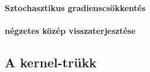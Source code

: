 \paragraph[SGD]{Sztochasztikus gradienscsökkentés}

\paragraph[RMSprop]{négzetes közép visszaterjesztése}


\subsection{A kernel-trükk}

